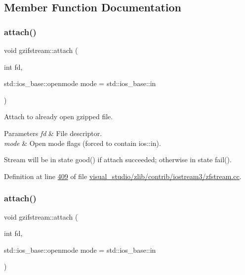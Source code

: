 \subsection{Member Function Documentation}
\mbox{\label{classgzifstream_a24aff901c395acbdaddb7878f4ddb7aa}} 
\subsubsection{\texorpdfstring{attach()}{attach()}\hspace{0.1cm}{\footnotesize\ttfamily [1/2]}}
{\footnotesize\ttfamily void gzifstream\+::attach (\begin{DoxyParamCaption}\item[{int}]{fd,  }\item[{std\+::ios\+\_\+base\+::openmode}]{mode = {\ttfamily std\+:\+:ios\+\_\+base\+:\+:in} }\end{DoxyParamCaption})}



Attach to already open gzipped file. 


\begin{DoxyParams}{Parameters}
{\em fd} & File descriptor. \\
\hline
{\em mode} & Open mode flags (forced to contain ios\+::in).\\
\hline
\end{DoxyParams}
Stream will be in state good() if attach succeeded; otherwise in state fail(). 

Definition at line \hyperlink{visual__studio_2zlib_2contrib_2iostream3_2zfstream_8cc_source_l00409}{409} of file \hyperlink{visual__studio_2zlib_2contrib_2iostream3_2zfstream_8cc_source}{visual\+\_\+studio/zlib/contrib/iostream3/zfstream.\+cc}.

\mbox{\label{classgzifstream_a24aff901c395acbdaddb7878f4ddb7aa}} 
\subsubsection{\texorpdfstring{attach()}{attach()}\hspace{0.1cm}{\footnotesize\ttfamily [2/2]}}
{\footnotesize\ttfamily void gzifstream\+::attach (\begin{DoxyParamCaption}\item[{int}]{fd,  }\item[{std\+::ios\+\_\+base\+::openmode}]{mode = {\ttfamily std\+:\+:ios\+\_\+base\+:\+:in} }\end{DoxyParamCaption})}



